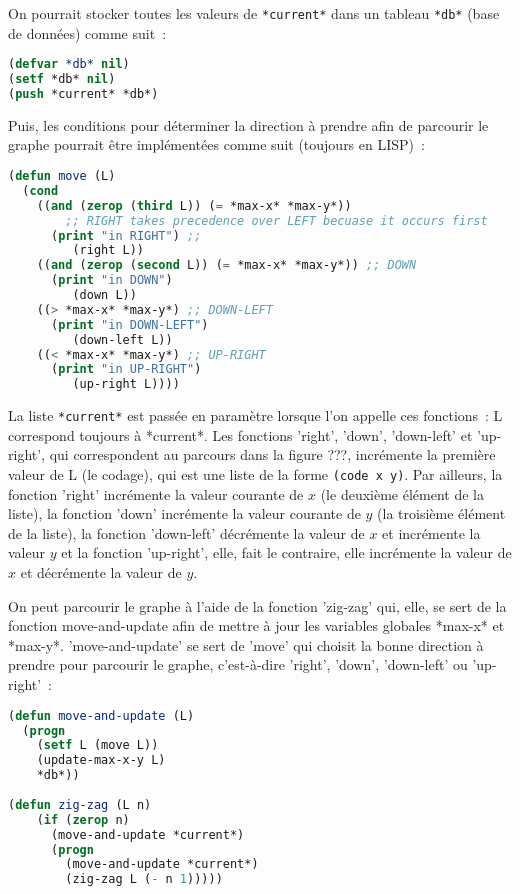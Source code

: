 \documentclass{article}
\begin{document}
On pourrait stocker toutes les valeurs de \lstinline!*current*! dans un tableau \lstinline!*db*! (base de données) comme suit~:

\begin{lstlisting}[language=Lisp]
(defvar *db* nil) 
(setf *db* nil)
(push *current* *db*)
\end{lstlisting}

Puis, les conditions pour déterminer la direction à prendre afin de parcourir le graphe pourrait être implémentées comme suit (toujours en LISP)~:

\begin{lstlisting}[language=Lisp]
(defun move (L)
  (cond
    ((and (zerop (third L)) (= *max-x* *max-y*)) 
		;; RIGHT takes precedence over LEFT becuase it occurs first
      (print "in RIGHT") ;; 
         (right L))
    ((and (zerop (second L)) (= *max-x* *max-y*)) ;; DOWN
      (print "in DOWN") 
         (down L))
    ((> *max-x* *max-y*) ;; DOWN-LEFT
      (print "in DOWN-LEFT")  
         (down-left L))
    ((< *max-x* *max-y*) ;; UP-RIGHT
      (print "in UP-RIGHT") 
         (up-right L))))
\end{lstlisting}
 
La liste \lstinline!*current*! est passée en paramètre lorsque l'on appelle ces fonctions~: L correspond toujours à *current*. Les fonctions 'right', 'down', 'down-left' et 'up-right', qui correspondent au parcours dans la figure ???, incrémente la première valeur de L (le codage), qui est une liste de la forme \lstinline!(code x y)!. Par ailleurs, la fonction 'right' incrémente la valeur courante de $x$ (le deuxième élément de la liste), la fonction 'down' incrémente la valeur courante de $y$ (la troisième élément de la liste), la fonction 'down-left' décrémente la valeur de $x$ et incrémente la valeur $y$ et la fonction 'up-right', elle, fait le contraire, elle incrémente la valeur de $x$ et décrémente la valeur de $y$. 

On peut parcourir le graphe à l'aide de la fonction 'zig-zag' qui, elle, se sert de la fonction move-and-update afin de mettre à jour les variables globales *max-x* et *max-y*. 'move-and-update' se sert de 'move' qui choisit la bonne direction à prendre pour parcourir le graphe, c'est-à-dire 'right', 'down', 'down-left' ou 'up-right'~:

\begin{lstlisting}[language=Lisp]
(defun move-and-update (L)
  (progn
    (setf L (move L))
    (update-max-x-y L)
    *db*))
 
(defun zig-zag (L n)
    (if (zerop n) 
      (move-and-update *current*)
      (progn
        (move-and-update *current*)
        (zig-zag L (- n 1)))))
\end{lstlisting}
\end{document}
